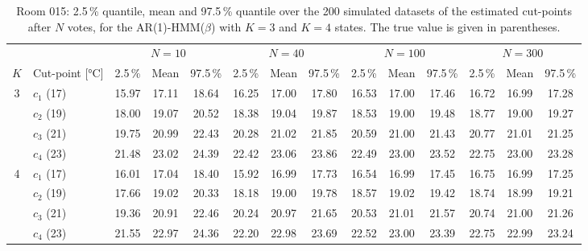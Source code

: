 \begin{table}[H]
\centering
\begin{adjustbox}{max width=\textwidth}
\begin{tabular}{clcccccccccccc}
\hline
 & & \multicolumn{3}{c}{$N = 10$} & \multicolumn{3}{c}{$N = 40$} & \multicolumn{3}{c}{$N = 100$} & \multicolumn{3}{c}{$N = 300$} \\
\cmidrule(lr){3-5} \cmidrule(lr){6-8} \cmidrule(lr){9-11} \cmidrule(lr){12-14}
$K$ & Cut-point [°C] & 2.5\,\% & Mean & 97.5\,\% & 2.5\,\% & Mean & 97.5\,\% & 2.5\,\% & Mean & 97.5\,\% & 2.5\,\% & Mean & 97.5\,\% \\
\hline
3 & $c_1$ (17) & 15.97 & 17.11 & 18.64 & 16.25 & 17.00 & 17.80 & 16.53 & 17.00 & 17.46 & 16.72 & 16.99 & 17.28 \\
 & $c_2$ (19) & 18.00 & 19.07 & 20.52 & 18.38 & 19.04 & 19.87 & 18.53 & 19.00 & 19.48 & 18.77 & 19.00 & 19.27 \\
 & $c_3$ (21) & 19.75 & 20.99 & 22.43 & 20.28 & 21.02 & 21.85 & 20.59 & 21.00 & 21.43 & 20.77 & 21.01 & 21.25 \\
 & $c_4$ (23) & 21.48 & 23.02 & 24.39 & 22.42 & 23.06 & 23.86 & 22.49 & 23.00 & 23.52 & 22.75 & 23.00 & 23.28 \\
\hline
4 & $c_1$ (17) & 16.01 & 17.04 & 18.40 & 15.92 & 16.99 & 17.73 & 16.54 & 16.99 & 17.45 & 16.75 & 16.99 & 17.25 \\
 & $c_2$ (19) & 17.66 & 19.02 & 20.33 & 18.18 & 19.00 & 19.78 & 18.57 & 19.02 & 19.42 & 18.74 & 18.99 & 19.21 \\
 & $c_3$ (21) & 19.36 & 20.91 & 22.46 & 20.24 & 20.97 & 21.65 & 20.53 & 21.01 & 21.57 & 20.74 & 21.00 & 21.26 \\
 & $c_4$ (23) & 21.55 & 22.97 & 24.36 & 22.20 & 22.98 & 23.69 & 22.52 & 23.00 & 23.39 & 22.75 & 22.99 & 23.24 \\
\hline
\end{tabular}
\end{adjustbox}
\caption{Room 015: 2.5\,\% quantile, mean and 97.5\,\% quantile over the 200 simulated datasets of the estimated cut-points after $N$ votes, for the AR(1)-HMM($\beta$) with $K=3$ and $K=4$ states. The true value is given in parentheses.}
\label{tab:room_015_cutpoints_quantiles}
\end{table}
